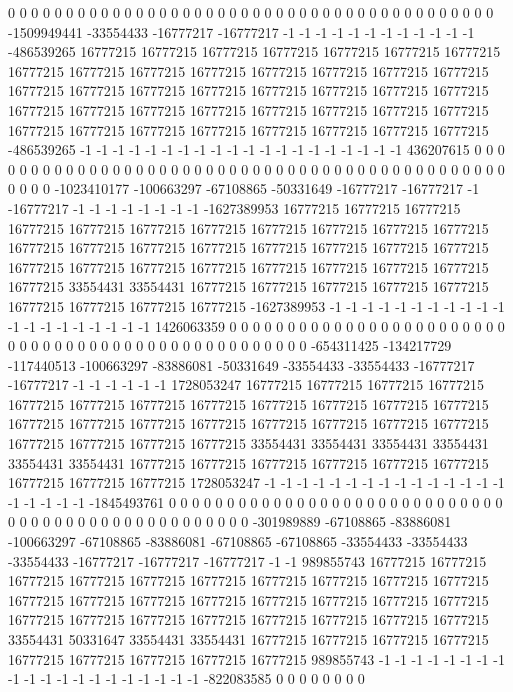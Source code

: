 0 0 0 0 0 0 0 0 0 0 0 0 0 0 0 0 0 0 0 0 0 0 0 0 0 0 0 0 0 0 0 0 0 0 0 0 0 0 0 0 0 0 -1509949441 -33554433 -16777217 -16777217 -1 -1 -1 -1 -1 -1 -1 -1 -1 -1 -1 -1 -486539265 16777215 16777215 16777215 16777215 16777215 16777215 16777215 16777215 16777215 16777215 16777215 16777215 16777215 16777215 16777215 16777215 16777215 16777215 16777215 16777215 16777215 16777215 16777215 16777215 16777215 16777215 16777215 16777215 16777215 16777215 16777215 16777215 16777215 16777215 16777215 16777215 16777215 16777215 16777215 -486539265 -1 -1 -1 -1 -1 -1 -1 -1 -1 -1 -1 -1 -1 -1 -1 -1 -1 -1 -1 -1 436207615 0 0 0 0 0 0 0 0
0 0 0 0 0 0 0 0 0 0 0 0 0 0 0 0 0 0 0 0 0 0 0 0 0 0 0 0 0 0 0 0 0 0 0 0 0 0 0 0 0 0 -1023410177 -100663297 -67108865 -50331649 -16777217 -16777217 -1 -16777217 -1 -1 -1 -1 -1 -1 -1 -1 -1627389953 16777215 16777215 16777215 16777215 16777215 16777215 16777215 16777215 16777215 16777215 16777215 16777215 16777215 16777215 16777215 16777215 16777215 16777215 16777215 16777215 16777215 16777215 16777215 16777215 16777215 16777215 16777215 16777215 33554431 33554431 16777215 16777215 16777215 16777215 16777215 16777215 16777215 16777215 16777215 -1627389953 -1 -1 -1 -1 -1 -1 -1 -1 -1 -1 -1 -1 -1 -1 -1 -1 -1 -1 -1 -1 1426063359 0 0 0 0 0 0 0 0
0 0 0 0 0 0 0 0 0 0 0 0 0 0 0 0 0 0 0 0 0 0 0 0 0 0 0 0 0 0 0 0 0 0 0 0 0 0 0 0 0 0 -654311425 -134217729 -117440513 -100663297 -83886081 -50331649 -33554433 -33554433 -16777217 -16777217 -1 -1 -1 -1 -1 -1 1728053247 16777215 16777215 16777215 16777215 16777215 16777215 16777215 16777215 16777215 16777215 16777215 16777215 16777215 16777215 16777215 16777215 16777215 16777215 16777215 16777215 16777215 16777215 16777215 16777215 33554431 33554431 33554431 33554431 33554431 33554431 16777215 16777215 16777215 16777215 16777215 16777215 16777215 16777215 16777215 1728053247 -1 -1 -1 -1 -1 -1 -1 -1 -1 -1 -1 -1 -1 -1 -1 -1 -1 -1 -1 -1 -1845493761 0 0 0 0 0 0 0 0
0 0 0 0 0 0 0 0 0 0 0 0 0 0 0 0 0 0 0 0 0 0 0 0 0 0 0 0 0 0 0 0 0 0 0 0 0 0 0 0 0 0 -301989889 -67108865 -83886081 -100663297 -67108865 -83886081 -67108865 -67108865 -33554433 -33554433 -33554433 -16777217 -16777217 -16777217 -1 -1 989855743 16777215 16777215 16777215 16777215 16777215 16777215 16777215 16777215 16777215 16777215 16777215 16777215 16777215 16777215 16777215 16777215 16777215 16777215 16777215 16777215 16777215 16777215 16777215 16777215 16777215 16777215 33554431 50331647 33554431 33554431 16777215 16777215 16777215 16777215 16777215 16777215 16777215 16777215 16777215 989855743 -1 -1 -1 -1 -1 -1 -1 -1 -1 -1 -1 -1 -1 -1 -1 -1 -1 -1 -1 -1 -822083585 0 0 0 0 0 0 0 0
